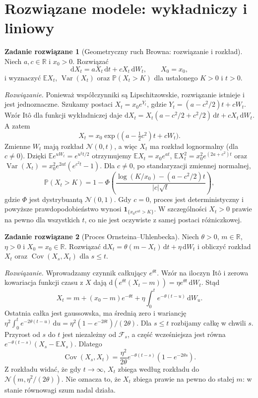 \documentclass[11pt,a4paper,oneside]{report}
\numberwithin{equation}{chapter}
\theoremstyle{plain}
\theoremstyle{definition}
\newtheorem{zadanie}{Zadanie rozwiązane}[chapter]
\theoremstyle{remark}
\newcommand{\R}{\mathbb{R}}
\newcommand{\Prob}{\mathbb{P}}
\newcommand{\E}{\mathbb{E}}
\newcommand{\Var}{\operatorname{Var}}
\newcommand{\Cov}{\operatorname{Cov}}
\newcommand{\calF}{\mathcal{F}}
\newcommand{\ind}[1]{\mathbf{1}_{#1}}
\newcommand{\dd}{\mathrm{d}}
\newcommand{\Normal}{\mathcal{N}}
\begin{document}
\section{Rozwiązane modele: wykładniczy i liniowy}
\begin{zadanie}[Geometryczny ruch Browna: rozwiązanie i rozkład]
\label{zad:gbm}
Niech $a,c\in\R$ i $x_0>0$. Rozwiązać
\[
\dd X_t=aX_t\,\dd t+cX_t\,\dd W_t,
\qquad X_0=x_0,
\]
i wyznaczyć $\E X_t$, $\Var(X_t)$ oraz
$\Prob(X_t>K)$ dla ustalonego $K>0$ i $t>0$.

\emph{Rozwiązanie.} Ponieważ współczynniki są
Lipschitzowskie, rozwiązanie istnieje i jest jednoznaczne.
Szukamy postaci $X_t=x_0e^{Y_t}$, gdzie
$Y_t=(a-c^2/2)t+cW_t$. Wzór Itô dla funkcji
wykładniczej daje
$\dd X_t=X_t(a-c^2/2+c^2/2)\,\dd t+cX_t\,\dd W_t$.
A zatem
\[
X_t=x_0\exp\bigl((a-\tfrac12c^2)t+cW_t\bigr).
\tag{5.7}\label{eq:gbm-solution}
\]
Zmienne $W_t$ mają rozkład $\Normal(0,t)$, a więc
$X_t$ ma rozkład lognormalny (dla $c\ne0$).
Dzięki $\E e^{uW_t}=e^{u^2t/2}$ otrzymujemy
$\E X_t=x_0e^{at}$,
$\E X_t^2=x_0^2e^{(2a+c^2)t}$ oraz
$\Var(X_t)=x_0^2e^{2at}(e^{c^2t}-1)$.
Dla $c\ne0$, po standaryzacji zmiennej normalnej,
\[
\Prob(X_t>K)=1-\Phi\!\left(
\frac{\log(K/x_0)-(a-c^2/2)t}{|c|\sqrt t}\right),
\]
gdzie $\Phi$ jest dystrybuantą $\Normal(0,1)$.
Gdy $c=0$, proces jest deterministyczny i powyższe
prawdopodobieństwo wynosi $\ind{\{x_0e^{at}>K\}}$.
W szczególności $X_t>0$ prawie na pewno dla wszystkich $t$,
co nie jest oczywiste z samej postaci różniczkowej.
\end{zadanie}

\begin{zadanie}[Proces Ornsteina--Uhlenbecka]
\label{zad:ou}
Niech $\theta>0$, $m\in\R$, $\eta>0$ i
$X_0=x_0\in\R$. Rozwiązać
$\dd X_t=\theta(m-X_t)\,\dd t+\eta\,\dd W_t$
i obliczyć rozkład $X_t$ oraz $\Cov(X_s,X_t)$ dla $s\le t$.

\emph{Rozwiązanie.} Wprowadzamy czynnik całkujący
$e^{\theta t}$. Wzór na iloczyn Itô i zerowa
kowariacja funkcji czasu z $X$ dają
$\dd(e^{\theta t}(X_t-m))=\eta e^{\theta t}\,\dd W_t$.
Stąd
\[
X_t=m+(x_0-m)e^{-\theta t}
+\eta\int_0^t e^{-\theta(t-u)}\,\dd W_u.
\tag{5.8}\label{eq:ou-solution}
\]
Ostatnia całka jest gaussowska, ma średnią zero
i wariancję $\eta^2\int_0^t e^{-2\theta(t-u)}\,\dd u
=\eta^2(1-e^{-2\theta t})/(2\theta)$.
Dla $s\le t$ rozbijamy całkę w chwili $s$.
Przyrost od $s$ do $t$ jest niezależny od $\calF_s$,
a część wcześniejsza jest równa
$e^{-\theta(t-s)}(X_s-\E X_s)$. Dlatego
\[
\Cov(X_s,X_t)=\frac{\eta^2}{2\theta}
 e^{-\theta(t-s)}(1-e^{-2\theta s}).
\]
Z rozkładu widać, że gdy $t\to\infty$,
$X_t$ zbiega według rozkładu do
$\Normal(m,\eta^2/(2\theta))$.
Nie oznacza to, że $X_t$ zbiega prawie na pewno
do stałej $m$: w stanie równowagi szum nadal działa.
\end{zadanie}
\end{document}
